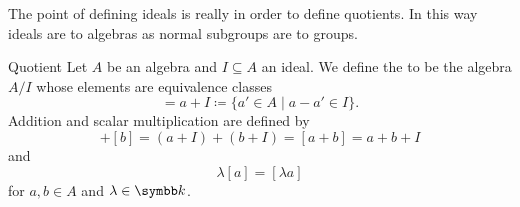 The point of defining ideals is really in order to define quotients.
In this way ideals are to algebras as normal subgroups are to groups.

\begin{dfn}{Quotient}{}
    Let \(A\) be an algebra and \(I \subseteq A\) an ideal.
    We define the  to be the algebra \(A/I\) whose elements are equivalence classes
    \begin{equation}
        [a] = a + I \coloneq \{a' \in A \mid a - a' \in I\}.
    \end{equation}
    Addition and scalar multiplication are defined by
    \begin{equation}
        [a] + [b] = (a + I) + (b + I) = [a + b] = a + b + I
    \end{equation}
    and
    \begin{equation}
        \lambda[a] = [\lambda a]
    \end{equation}
    for \(a, b \in A\) and \(\lambda \in \field\).
\end{dfn}

